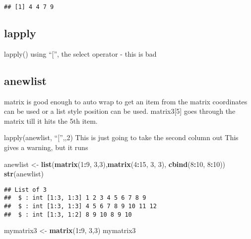 \documentclass[
]{article}
\newenvironment{Shaded}{\begin{snugshade}}{\end{snugshade}}
\newcommand{\DecValTok}[1]{\textcolor[rgb]{0.00,0.00,0.81}{#1}}
\newcommand{\KeywordTok}[1]{\textcolor[rgb]{0.13,0.29,0.53}{\textbf{#1}}}
\newcommand{\NormalTok}[1]{#1}
\newcommand{\OperatorTok}[1]{\textcolor[rgb]{0.81,0.36,0.00}{\textbf{#1}}}
\newcommand{\StringTok}[1]{\textcolor[rgb]{0.31,0.60,0.02}{#1}}
\begin{document}
\begin{verbatim}
## [1] 4 4 7 9
\end{verbatim}

\hypertarget{lapply}{%
\subsection{lapply}\label{lapply}}

lapply() using ``{[}'', the select operator - this is bad

\hypertarget{anewlist}{%
\subsection{anewlist}\label{anewlist}}

matrix is good enough to auto wrap to get an item from the matrix
coordinates can be used or a list style position can be used.
matrix3{[}5{]} goes through the matrix till it hits the 5th item.

lapply(anewlist, ``{[}'',,2) This is just going to take the second
column out This gives a warning, but it runs

\begin{Shaded}
\begin{Highlighting}[]
\NormalTok{anewlist <-}\StringTok{ }\KeywordTok{list}\NormalTok{(}\KeywordTok{matrix}\NormalTok{(}\DecValTok{1}\OperatorTok{:}\DecValTok{9}\NormalTok{, }\DecValTok{3}\NormalTok{,}\DecValTok{3}\NormalTok{),}\KeywordTok{matrix}\NormalTok{(}\DecValTok{4}\OperatorTok{:}\DecValTok{15}\NormalTok{, }\DecValTok{3}\NormalTok{, }\DecValTok{3}\NormalTok{), }\KeywordTok{cbind}\NormalTok{(}\DecValTok{8}\OperatorTok{:}\DecValTok{10}\NormalTok{, }\DecValTok{8}\OperatorTok{:}\DecValTok{10}\NormalTok{))}
\KeywordTok{str}\NormalTok{(anewlist)}
\end{Highlighting}
\end{Shaded}

\begin{verbatim}
## List of 3
##  $ : int [1:3, 1:3] 1 2 3 4 5 6 7 8 9
##  $ : int [1:3, 1:3] 4 5 6 7 8 9 10 11 12
##  $ : int [1:3, 1:2] 8 9 10 8 9 10
\end{verbatim}

\begin{Shaded}
\begin{Highlighting}[]
\NormalTok{mymatrix3 <-}\StringTok{ }\KeywordTok{matrix}\NormalTok{(}\DecValTok{1}\OperatorTok{:}\DecValTok{9}\NormalTok{, }\DecValTok{3}\NormalTok{,}\DecValTok{3}\NormalTok{)}
\NormalTok{mymatrix3}
\end{Highlighting}
\end{Shaded}
\end{document}
